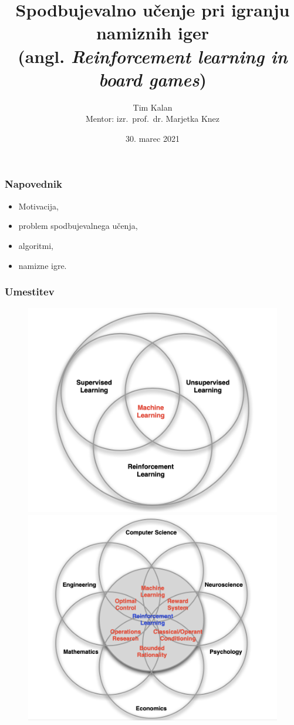 \documentclass{beamer}    %
\author{Tim Kalan \\ \medskip
        \footnotesize Mentor: izr.~prof.~dr. Marjetka Knez}
\institute[FMF]{Fakulteta za matematiko in fiziko}
\title{
    Spodbujevalno učenje pri igranju namiznih iger \\ 
    \large (angl. \textit{Reinforcement learning in board games})}
\date{30. marec 2021}
\begin{document}
\begin{frame}
    \titlepage
\end{frame}


\begin{frame}
    \frametitle{Napovednik}
    \begin{itemize}
        \item Motivacija, 
        \item problem spodbujevalnega učenja, 
        \item algoritmi, 
        \item namizne igre.
    \end{itemize}
\end{frame}


\begin{frame}
    \frametitle{Umestitev}
    \begin{figure}[b]
        \includegraphics[scale=0.31]{slike/uvod-ml.png}
        \includegraphics[scale=0.31]{slike/uvod-rl.png}
    \end{figure}
\end{frame}
\end{document}
